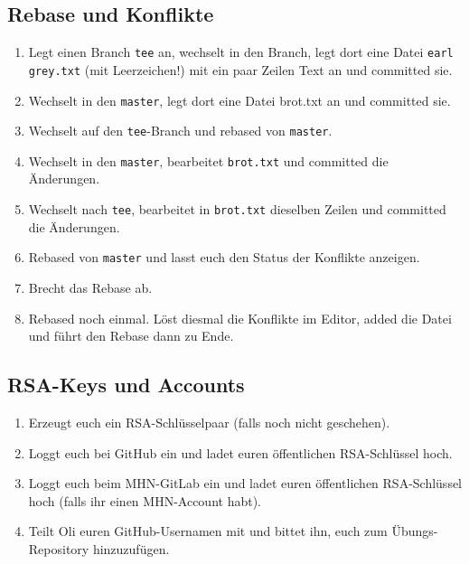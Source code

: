 \documentclass[a4paper,12pt]{scrartcl}
\begin{document}
\subsection{Rebase und Konflikte}
\begin{enumerate}
  \item Legt einen Branch \texttt{tee} an, wechselt in den Branch, legt dort eine Datei \texttt{earl grey.txt} (mit Leerzeichen!) mit ein paar Zeilen Text an und committed sie.
  \item Wechselt in den \texttt{master}, legt dort eine Datei {brot.txt} an und committed sie.
  \item Wechselt auf den \texttt{tee}-Branch und rebased von \texttt{master}.
  \item Wechselt in den \texttt{master}, bearbeitet \texttt{brot.txt} und committed die Änderungen.
  \item Wechselt nach \texttt{tee}, bearbeitet in \texttt{brot.txt} dieselben Zeilen und committed die Änderungen.
  \item Rebased von \texttt{master} und lasst euch den Status der Konflikte anzeigen.
  \item Brecht das Rebase ab.
  \item Rebased noch einmal. Löst diesmal die Konflikte im Editor, added die Datei und führt den Rebase dann zu Ende.
\end{enumerate}


\subsection{RSA-Keys und Accounts}
\begin{enumerate}
  \item Erzeugt euch ein RSA-Schlüsselpaar (falls noch nicht geschehen).
  \item Loggt euch bei GitHub ein und ladet euren öffentlichen RSA-Schlüssel hoch.
  \item Loggt euch beim MHN-GitLab ein und ladet euren öffentlichen RSA-Schlüssel hoch (falls ihr einen MHN-Account habt).
  \item Teilt Oli euren GitHub-Usernamen mit und bittet ihn, euch zum Übungs-Repository hinzuzufügen.
\end{enumerate}
\end{document}
